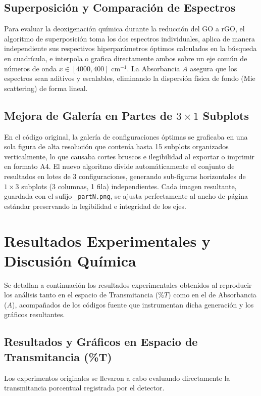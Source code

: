 \documentclass[a4paper,11pt]{article}
\begin{document}
\subsection{Superposición y Comparación de Espectros}
Para evaluar la deoxigenación química durante la reducción del GO a rGO, el algoritmo de superposición toma los dos espectros individuales, aplica de manera independiente sus respectivos hiperparámetros óptimos calculados en la búsqueda en cuadrícula, e interpola o grafica directamente ambos sobre un eje común de números de onda $x \in [4000, 400]$ cm$^{-1}$. La Absorbancia $A$ asegura que los espectros sean aditivos y escalables, eliminando la dispersión física de fondo (Mie scattering) de forma lineal.

\subsection{Mejora de Galería en Partes de $3 \times 1$ Subplots}
En el código original, la galería de configuraciones óptimas se graficaba en una sola figura de alta resolución que contenía hasta 15 subplots organizados verticalmente, lo que causaba cortes bruscos e ilegibilidad al exportar o imprimir en formato A4. El nuevo algoritmo divide automáticamente el conjunto de resultados en lotes de 3 configuraciones, generando sub-figuras horizontales de $1 \times 3$ subplots (3 columnas, 1 fila) independientes. Cada imagen resultante, guardada con el sufijo \texttt{\_partN.png}, se ajusta perfectamente al ancho de página estándar preservando la legibilidad e integridad de los ejes.

\section{Resultados Experimentales y Discusión Química}
Se detallan a continuación los resultados experimentales obtenidos al reproducir los análisis tanto en el espacio de Transmitancia ($\%T$) como en el de Absorbancia ($A$), acompañados de los códigos fuente que instrumentan dicha generación y los gráficos resultantes.

\subsection{Resultados y Gráficos en Espacio de Transmitancia (\%T)}
Los experimentos originales se llevaron a cabo evaluando directamente la transmitancia porcentual registrada por el detector.
\end{document}

